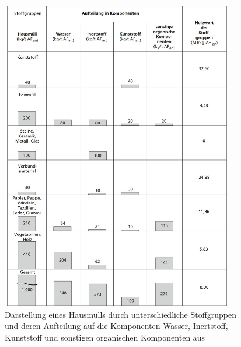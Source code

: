 \begin{figure}[h!]
	\centering
	\includegraphics[width=0.90\textwidth]{img/ThermischeVerfahren}
	\caption[Darstellung eines Hausmülls durch unterschiedliche Stoffgruppen und deren Aufteilung auf die Komponenten Wasser, Inertstoff, Kunststoff und sonstigen organischen Komponenten]{Darstellung eines Hausmülls durch unterschiedliche Stoffgruppen und deren Aufteilung auf die Komponenten Wasser, Inertstoff, Kunststoff und sonstigen organischen Komponenten aus \cite[S.23]{scholz2013}}
	\label{fig:ersatzbrennstoffe}
\end{figure}
\FloatBarrier

